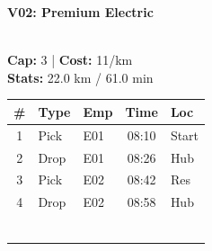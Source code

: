 \documentclass[a4paper,11pt]{article}
\begin{document}
\hfill
\begin{minipage}[t]{0.32\textwidth}
    \centering
    \colorbox{velorablue}{\parbox{\dimexpr\linewidth-2\fboxsep}{\centering \color{white}\textbf{V02: Premium Electric}}} \\
    \vspace{0.05cm}
    {\tiny \textbf{Cap:} 3 | \textbf{Cost:} 11/km \\ \textbf{Stats:} 22.0 km / 61.0 min}
    \vspace{0.05cm}
    
    \renewcommand{\arraystretch}{0.85}
    \setlength{\tabcolsep}{1pt}
    \tiny
    \begin{tabular}{c l l c l}
        \toprule
        \textbf{\#} & \textbf{Type} & \textbf{Emp} & \textbf{Time} & \textbf{Loc} \\
        \midrule
        1 & Pick & E01 & 08:10 & Start \\
        \rowcolor{headergray} 2 & Drop & E01 & 08:26 & Hub \\
        3 & Pick & E02 & 08:42 & Res \\
        \rowcolor{headergray} 4 & Drop & E02 & 08:58 & Hub \\
        & & & & \\
        & & & & \\
        & & & & \\
        & & & & \\
        & & & & \\
        & & & & \\
        \bottomrule
    \end{tabular}
\end{minipage}
\hfill
\end{document}
